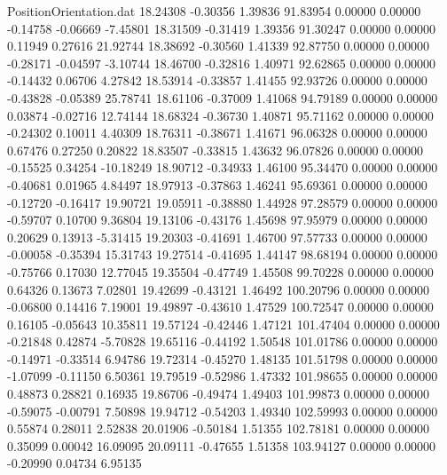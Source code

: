 \begin{filecontents}{PositionOrientation.dat}
  18.24308   -0.30356    1.39836    91.83954    0.00000    0.00000   -0.14758   -0.06669   -7.45801
  18.31509   -0.31419    1.39356    91.30247    0.00000    0.00000    0.11949    0.27616   21.92744
  18.38692   -0.30560    1.41339    92.87750    0.00000    0.00000   -0.28171   -0.04597   -3.10744
  18.46700   -0.32816    1.40971    92.62865    0.00000    0.00000   -0.14432    0.06706    4.27842
  18.53914   -0.33857    1.41455    92.93726    0.00000    0.00000   -0.43828   -0.05389   25.78741
  18.61106   -0.37009    1.41068    94.79189    0.00000    0.00000    0.03874   -0.02716   12.74144
  18.68324   -0.36730    1.40871    95.71162    0.00000    0.00000   -0.24302    0.10011    4.40309
  18.76311   -0.38671    1.41671    96.06328    0.00000    0.00000    0.67476    0.27250    0.20822
  18.83507   -0.33815    1.43632    96.07826    0.00000    0.00000   -0.15525    0.34254  -10.18249
  18.90712   -0.34933    1.46100    95.34470    0.00000    0.00000   -0.40681    0.01965    4.84497
  18.97913   -0.37863    1.46241    95.69361    0.00000    0.00000   -0.12720   -0.16417   19.90721
  19.05911   -0.38880    1.44928    97.28579    0.00000    0.00000   -0.59707    0.10700    9.36804
  19.13106   -0.43176    1.45698    97.95979    0.00000    0.00000    0.20629    0.13913   -5.31415
  19.20303   -0.41691    1.46700    97.57733    0.00000    0.00000   -0.00058   -0.35394   15.31743
  19.27514   -0.41695    1.44147    98.68194    0.00000    0.00000   -0.75766    0.17030   12.77045
  19.35504   -0.47749    1.45508    99.70228    0.00000    0.00000    0.64326    0.13673    7.02801
  19.42699   -0.43121    1.46492   100.20796    0.00000    0.00000   -0.06800    0.14416    7.19001
  19.49897   -0.43610    1.47529   100.72547    0.00000    0.00000    0.16105   -0.05643   10.35811
  19.57124   -0.42446    1.47121   101.47404    0.00000    0.00000   -0.21848    0.42874   -5.70828
  19.65116   -0.44192    1.50548   101.01786    0.00000    0.00000   -0.14971   -0.33514    6.94786
  19.72314   -0.45270    1.48135   101.51798    0.00000    0.00000   -1.07099   -0.11150    6.50361
  19.79519   -0.52986    1.47332   101.98655    0.00000    0.00000    0.48873    0.28821    0.16935
  19.86706   -0.49474    1.49403   101.99873    0.00000    0.00000   -0.59075   -0.00791    7.50898
  19.94712   -0.54203    1.49340   102.59993    0.00000    0.00000    0.55874    0.28011    2.52838
  20.01906   -0.50184    1.51355   102.78181    0.00000    0.00000    0.35099    0.00042   16.09095
  20.09111   -0.47655    1.51358   103.94127    0.00000    0.00000   -0.20990    0.04734    6.95135

\end{filecontents}
